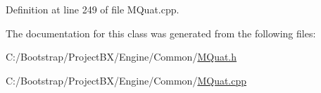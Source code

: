 Definition at line 249 of file MQuat.cpp.

The documentation for this class was generated from the following files:\begin{CompactItemize}
\item 
C:/Bootstrap/ProjectBX/Engine/Common/\hyperlink{_m_quat_8h}{MQuat.h}\item 
C:/Bootstrap/ProjectBX/Engine/Common/\hyperlink{_m_quat_8cpp}{MQuat.cpp}\end{CompactItemize}
